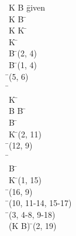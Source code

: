 \documentclass{article}
\begin{document}
\begin{proofbox}
\: K \leftrightarrow \lnot B \= \hbox{given} \\
\open
\: K \leftrightarrow B \= \asm \\
\: K \lor \lnot K \= \lem \\
\openAlt
\: K \= \asm \\
\: B \= \iffelim(2, 4) \\
\: \lnot B \= \iffelim(1, 4) \\
\: \bot \= \bottomintro(5, 6) \\
\: \bot \=  \\
\splitAlt
\: \lnot K \= \asm \\
\: B \lor \lnot B \= \lem \\
\openAlt
\: B \= \asm \\
\: K \= \iffelim(2, 11) \\
\: \bot \= \bottomintro(12, 9) \\
\: \bot \=  \\
\splitAlt
\: \lnot B \= \asm \\
\: K \= \iffelim(1, 15) \\
\: \bot \= \bottomintro(16, 9) \\
\closeAlt
\: \bot \= \orelim(10, 11-14, 15-17) \\
\closeAlt
\: \bot \= \orelim(3, 4-8, 9-18) \\
\close
\: \lnot (K \leftrightarrow B) \= \notintro(2, 19) \\
\end{proofbox}
\end{document}
